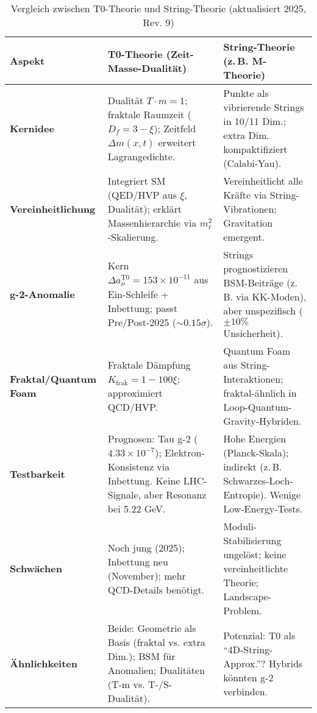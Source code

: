 \documentclass[12pt,a4paper]{article}
\theoremstyle{definition}
\begin{document}
	\begin{table}[ht]
		\centering
		\begin{adjustbox}{max width=\textwidth}
			\begin{tabular}{|p{3.5cm}|p{4.5cm}|p{4.5cm}|}
				\hline
				\textbf{Aspekt} & \textbf{T0-Theorie (Zeit-Masse-Dualität)} & \textbf{String-Theorie (z.\,B. M-Theorie)} \\
				\hline
				\textbf{Kernidee} & Dualität $T \cdot m = 1$; fraktale Raumzeit ($D_f = 3 - \xi$); Zeitfeld $\Delta m(x,t)$ erweitert Lagrangedichte. & Punkte als vibrierende Strings in 10/11 Dim.; extra Dim. kompaktifiziert (Calabi-Yau). \\
				\hline
				\textbf{Vereinheitlichung} & Integriert SM (QED/HVP aus $\xi$, Dualität); erklärt Massenhierarchie via $m_\ell^2$-Skalierung. & Vereinheitlicht alle Kräfte via String-Vibrationen; Gravitation emergent. \\
				\hline
				\textbf{g-2-Anomalie} & Kern $\Delta a_\mu^{\text{T0}} = 153 \times 10^{-11}$ aus Ein-Schleife + Inbettung; passt Pre/Post-2025 ($\sim 0.15 \sigma$). & Strings prognostizieren BSM-Beiträge (z.\,B. via KK-Moden), aber unspezifisch ($\pm 10\%$ Unsicherheit). \\
				\hline
				\textbf{Fraktal/Quantum Foam} & Fraktale Dämpfung $K_{\text{frak}} = 1 - 100\xi$; approximiert QCD/HVP. & Quantum Foam aus String-Interaktionen; fraktal-ähnlich in Loop-Quantum-Gravity-Hybriden. \\
				\hline
				\textbf{Testbarkeit} & Prognosen: Tau g-2 ($4.33 \times 10^{-7}$); Elektron-Konsistenz via Inbettung. Keine LHC-Signale, aber Resonanz bei 5.22 GeV. & Hohe Energien (Planck-Skala); indirekt (z.\,B. Schwarzes-Loch-Entropie). Wenige Low-Energy-Tests. \\
				\hline
				\textbf{Schwächen} & Noch jung (2025); Inbettung neu (November); mehr QCD-Details benötigt. & Moduli-Stabilisierung ungelöst; keine vereinheitlichte Theorie; Landscape-Problem. \\
				\hline
				\textbf{Ähnlichkeiten} & Beide: Geometrie als Basis (fraktal vs. extra Dim.); BSM für Anomalien; Dualitäten (T-m vs. T-/S-Dualität). & Potenzial: T0 als ``4D-String-Approx.''? Hybrids könnten g-2 verbinden. \\
				\hline
			\end{tabular}
		\end{adjustbox}
		\caption{Vergleich zwischen T0-Theorie und String-Theorie (aktualisiert 2025, Rev. 9)}
		\label{tab:string_comparison}
	\end{table}
	
\end{document}

